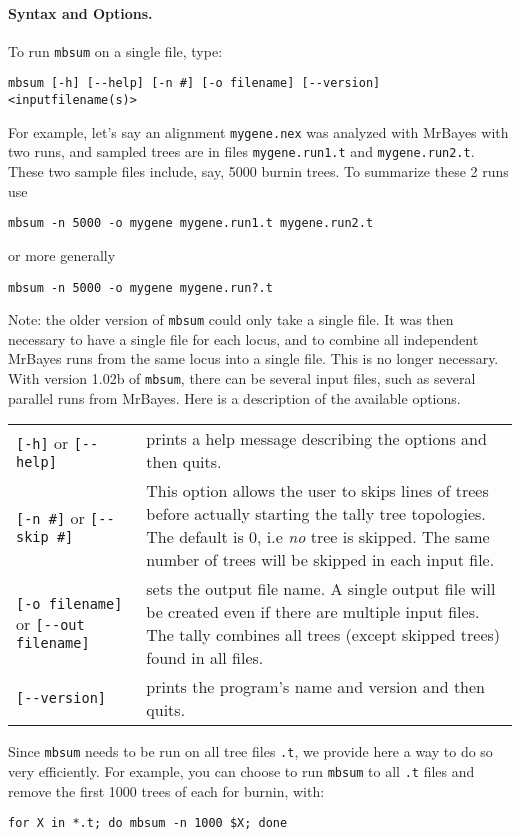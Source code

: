 \documentclass[12pt,english,final,letterpaper]{article}
\begin{document}
\paragraph{Syntax and Options.}
To run {\tt mbsum} on a single file, type:
\begin{verbatim}
mbsum [-h] [--help] [-n #] [-o filename] [--version] <inputfilename(s)> 
\end{verbatim}
For example, let's say an alignment \texttt{mygene.nex} was 
analyzed with MrBayes with two runs, and sampled trees are in files
\texttt{mygene.run1.t} and \texttt{mygene.run2.t}. These two
sample files include, say, 5000 burnin trees. To summarize 
these 2 runs  use
\begin{verbatim}
mbsum -n 5000 -o mygene mygene.run1.t mygene.run2.t
\end{verbatim}
or more generally
\begin{verbatim}
mbsum -n 5000 -o mygene mygene.run?.t
\end{verbatim}
Note: the older version of \texttt{mbsum} could only take a single
file. It was then necessary to have a single file for each locus, 
and to combine all independent MrBayes runs from the same locus
into a single file. This is no longer necessary. 
With version 1.02b of \texttt{mbsum}, there can be several 
input files, such as several parallel runs from MrBayes.
Here is a description of the available options.
\begin{center}
\begin{tabular}{p{1.59in}|p{4.7in}}
{\tt [-h]} or \verb+[--help]+& prints a help message describing the options
and then quits.\\
{\tt [-n \#]} or \verb+[--skip #]+& This option allows the user to 
skips lines of trees before actually starting the tally tree 
topologies. The default is 0, i.e {\em no} tree is skipped. 
The same number of trees will be skipped in each input file.\\
{\tt [-o filename]} or \verb+[--out filename]+& sets the output file name. A single output
file will be created even if there are multiple input files.
The tally combines all trees (except skipped trees) found in all 
files. \\
\verb+[--version]+& prints the program's name and version and then quits.
\end{tabular}\end{center}
Since {\tt mbsum} needs to be run on all tree files {\tt *.t}, we provide
here a way to do so very efficiently. For example, you can choose to run 
{\tt mbsum} to all {\tt *.t} files and remove the first 1000 trees of 
each for burnin, with:
\begin{verbatim}
for X in *.t; do mbsum -n 1000 $X; done
\end{verbatim} %
\end{document}
